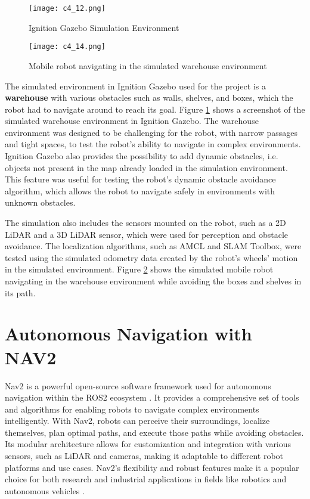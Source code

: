 \begin{figure}[t]
    \centering
    \texttt{[image: c4\_12.png]}
    \caption{Ignition Gazebo Simulation Environment}
    \label{fig:ignition}
\end{figure}

\begin{figure}[t]
    \centering
    \texttt{[image: c4\_14.png]}
    \caption{Mobile robot navigating in the simulated warehouse environment}
    \label{fig:warehousenav2}
\end{figure}

The simulated environment in Ignition Gazebo used for the project is a \textbf{warehouse}
with various obstacles such as walls, shelves, and boxes, which the robot had to navigate around to reach its goal.
Figure \ref{fig:ignition} shows a screenshot of the simulated warehouse environment in Ignition Gazebo.
The warehouse environment was designed to be challenging
for the robot, with narrow passages and tight spaces, to test the robot's ability to navigate in complex environments.
Ignition Gazebo also provides the possibility to add dynamic obstacles, i.e. objects not present in the map
already loaded in the simulation environment. This feature was useful for testing the robot's dynamic obstacle avoidance
algorithm, which allows the robot to navigate safely in environments with unknown obstacles.

The simulation also includes the sensors mounted on the robot, such as a 2D LiDAR and a 3D LiDAR sensor, which were used
for perception and obstacle avoidance. The localization algorithms, such as AMCL and SLAM Toolbox,
were tested using the simulated odometry data created by the robot's wheels' motion in the simulated environment. Figure 
\ref{fig:warehousenav2} shows the simulated mobile robot navigating in the warehouse environment
while avoiding the boxes and shelves in its path.

\section{Autonomous Navigation with NAV2}
\label{sec:nav2}

Nav2 is a powerful open-source software framework used for autonomous navigation within the ROS2 ecosystem
\cite{macenski2020nav2}.
It provides a comprehensive set of tools and algorithms for enabling robots to navigate complex environments intelligently.
With Nav2, robots can perceive their surroundings, localize themselves, plan optimal paths, and execute 
those paths while avoiding obstacles. Its modular architecture allows for customization and integration with various sensors,
such as LiDAR and cameras, making it adaptable to different robot platforms and use cases. 
Nav2's flexibility and robust features make it a popular choice for both research and industrial applications 
in fields like robotics and autonomous vehicles
\cite{macenski2023survey}.

